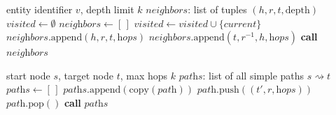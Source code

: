 \documentclass[12pt,a4paper]{article}
\newcommand{\kgE}{\mathcal{E}}
\begin{document}
\begin{algorithm}[H]
\caption{Multi-Hop DFS Neighbourhood Traversal}
\label{alg:dfs}
\begin{algorithmic}[1]
\Require entity identifier $v$, depth limit $k$
\Ensure $\textit{neighbors}$: list of tuples $(h, r, t, \text{depth})$
\State $\textit{visited} \leftarrow \emptyset$
\State $\textit{neighbors} \leftarrow [\,]$
    \Return
  \EndIf
  \State $\textit{visited} \leftarrow \textit{visited} \cup \{\textit{current}\}$
  \ForAll{$(h, r, t) \in \kgE$}
      \State $\textit{neighbors}.\text{append}(h, r, t, \textit{hops})$   \State {}
      \State $\textit{neighbors}.\text{append}(t, r^{-1}, h, \textit{hops})$   \State {}
    \EndIf
  \EndFor
\EndProcedure
\State \textbf{call} 
\State \Return $\textit{neighbors}$
\end{algorithmic}
\end{algorithm}

\begin{algorithm}[H]
\caption{DFS Path Finding Between Two KG Nodes}
\label{alg:path}
\begin{algorithmic}[1]
\Require start node $s$, target node $t$, max hops $k$
\Ensure $\textit{paths}$: list of all simple paths $s \rightsquigarrow t$
\State $\textit{paths} \leftarrow [\,]$
   \Return \EndIf
    \State $\textit{paths}.\text{append}(\text{copy}(\textit{path}))$
    \Return
  \EndIf
  \ForAll{$(h, r, t') \in \kgE$}
      \State $\textit{path}.\text{push}((t', r, \textit{hops}))$ \State {}
      \State $\textit{path}.\text{pop}()$ 
    \EndIf
  \EndFor
\EndProcedure
\State \textbf{call} 
\State \Return $\textit{paths}$
\end{algorithmic}
\end{algorithm}
\end{document}
